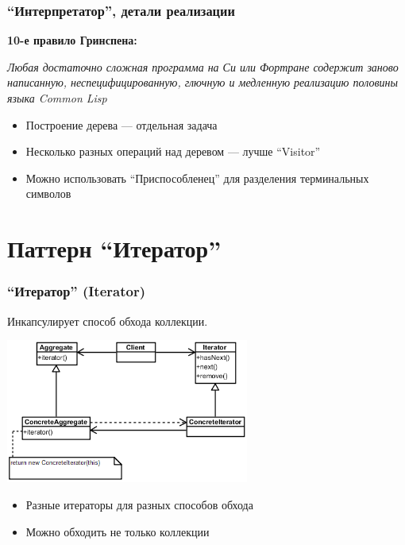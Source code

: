 \documentclass[xetex,mathserif,serif]{beamer}
\begin{document}
    \begin{frame}
        \frametitle{``Интерпретатор'', детали реализации}
        \begin{footnotesize}
            \textbf{10-е правило Гринспена:}
            
            \textit{Любая достаточно сложная программа на Си или Фортране содержит заново написанную, неспецифицированную, глючную и медленную реализацию половины языка Common Lisp}
        \end{footnotesize}
        \begin{itemize}
            \item Построение дерева --- отдельная задача
            \item Несколько разных операций над деревом --- лучше ``Visitor''
            \item Можно использовать ``Приспособленец'' для разделения терминальных символов
        \end{itemize}
    \end{frame}

    \section{Паттерн ``Итератор''}

    \begin{frame}
        \frametitle{``Итератор'' (Iterator)}
        Инкапсулирует способ обхода коллекции.
        \begin{center}
            \includegraphics[width=0.6\textwidth]{iterator.png}
        \end{center}
        \begin{itemize}
            \item Разные итераторы для разных способов обхода
            \item Можно обходить не только коллекции
        \end{itemize}
    \end{frame}
\end{document}
